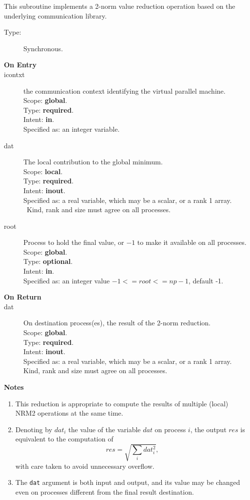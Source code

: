 This subroutine implements a 2-norm value reduction 
operation based on the underlying communication library. 
\begin{description}
\item[Type:] Synchronous.
\item[\bf  On Entry ]
\item[icontxt] the communication context identifying the virtual
  parallel machine.\\
Scope: {\bf global}.\\
Type: {\bf required}.\\
Intent: {\bf in}.\\
Specified as: an integer variable.
\item[dat] The local contribution to the global minimum.\\
Scope: {\bf local}.\\
Type: {\bf required}.\\
Intent: {\bf inout}.\\
Specified as: a real variable, which may be a
scalar, or a rank 1 array. \
Kind, rank and size must agree on all processes.
\item[root] Process to hold the final value, or $-1$ to make it available
  on all processes.\\
Scope: {\bf global}.\\
Type: {\bf optional}.\\
Intent: {\bf in}.\\
Specified as: an integer value $-1<= root <= np-1$, default -1. \\
\end{description}


\begin{description}
\item[\bf On Return]
\item[dat] On destination process(es), the result of the 2-norm reduction.\\
Scope: {\bf global}.\\
Type: {\bf required}.\\
Intent: {\bf inout}.\\
Specified as: a real variable, which may be a
scalar, or a rank 1 array. \\
Kind, rank and size must agree on all processes.
\end{description}


{\par\noindent\large\bfseries Notes}
\begin{enumerate}
\item This reduction is appropriate to compute the results of multiple
  (local) NRM2 operations at the same time. 
\item Denoting by $dat_i$ the value of the variable $dat$ on process
  $i$, the output $res$ is equivalent to the computation of
  \[ res = \sqrt{\sum_i dat_i^2},\]
  with care taken to avoid unnecessary overflow.
\item The \verb|dat| argument is both input and output, and its
  value may be changed even on processes different from the final
  result destination.
\end{enumerate}



